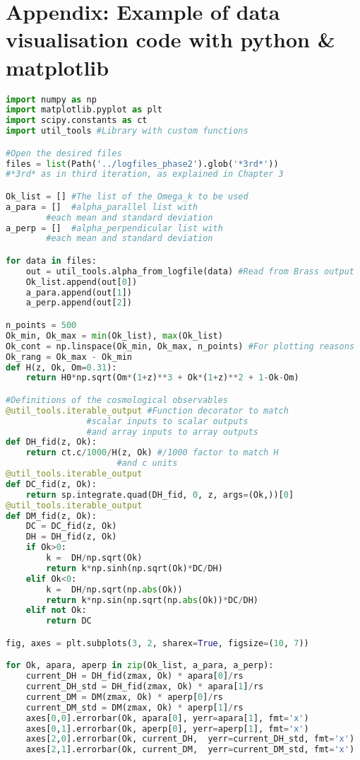 \chapter*{Appendix: Example of data visualisation code with python \& matplotlib}

\renewcommand{\baselinestretch}{1}
\begin{lstlisting}[language=python]
import numpy as np
import matplotlib.pyplot as plt
import scipy.constants as ct
import util_tools #Library with custom functions

#Open the desired files
files = list(Path('../logfiles_phase2').glob('*3rd*')) 
#*3rd* as in third iteration, as explained in Chapter 3

Ok_list = [] #The list of the Omega_k to be used
a_para = []  #alpha_parallel list with 
		#each mean and standard deviation
a_perp = []  #alpha_perpendicular list with 
		#each mean and standard deviation

for data in files:
    out = util_tools.alpha_from_logfile(data) #Read from Brass output
    Ok_list.append(out[0])
    a_para.append(out[1])
    a_perp.append(out[2])

n_points = 500
Ok_min, Ok_max = min(Ok_list), max(Ok_list)
Ok_cont = np.linspace(Ok_min, Ok_max, n_points) #For plotting reasons
Ok_rang = Ok_max - Ok_min
def H(z, Ok, Om=0.31):
    return H0*np.sqrt(Om*(1+z)**3 + Ok*(1+z)**2 + 1-Ok-Om)

#Definitions of the cosmological observables
@util_tools.iterable_output #Function decorator to match
			    #scalar inputs to scalar outputs
			    #and array inputs to array outputs
def DH_fid(z, Ok):
    return ct.c/1000/H(z, Ok) #/1000 factor to match H
    			      #and c units
@util_tools.iterable_output
def DC_fid(z, Ok):
    return sp.integrate.quad(DH_fid, 0, z, args=(Ok,))[0]
@util_tools.iterable_output
def DM_fid(z, Ok):
    DC = DC_fid(z, Ok)
    DH = DH_fid(z, Ok)
    if Ok>0:
        k =  DH/np.sqrt(Ok)
        return k*np.sinh(np.sqrt(Ok)*DC/DH)
    elif Ok<0:
        k =  DH/np.sqrt(np.abs(Ok))
        return k*np.sin(np.sqrt(np.abs(Ok))*DC/DH)
    elif not Ok:
        return DC

fig, axes = plt.subplots(3, 2, sharex=True, figsize=(10, 7))

for Ok, apara, aperp in zip(Ok_list, a_para, a_perp):
    current_DH = DH_fid(zmax, Ok) * apara[0]/rs
    current_DH_std = DH_fid(zmax, Ok) * apara[1]/rs
    current_DM = DM(zmax, Ok) * aperp[0]/rs
    current_DM_std = DM(zmax, Ok) * aperp[1]/rs
    axes[0,0].errorbar(Ok, apara[0], yerr=apara[1], fmt='x')
    axes[0,1].errorbar(Ok, aperp[0], yerr=aperp[1], fmt='x')
    axes[2,0].errorbar(Ok, current_DH,  yerr=current_DH_std, fmt='x') 
    axes[2,1].errorbar(Ok, current_DM,  yerr=current_DM_std, fmt='x') 


\end{lstlisting}
